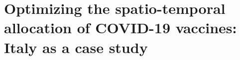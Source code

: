 \chapter{Optimizing the spatio-temporal allocation of COVID-19 vaccines: Italy as a case study}
\label{ch:covid-italy-ocp}